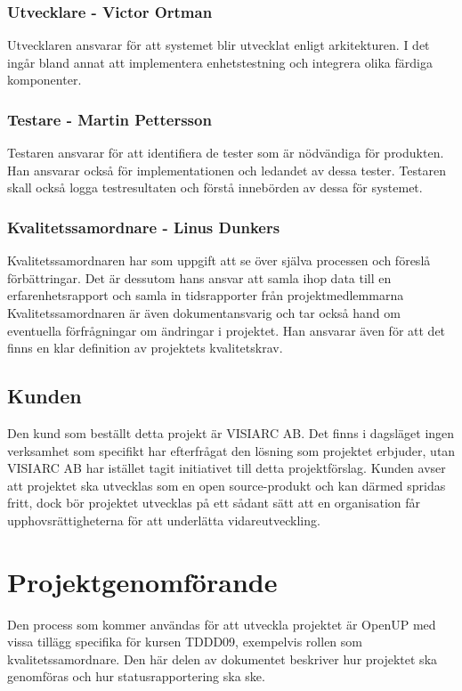 \subsubsection*{Utvecklare - Victor Ortman}
Utvecklaren ansvarar för att systemet blir utvecklat enligt arkitekturen. I det ingår bland annat att implementera enhetstestning och integrera olika färdiga komponenter.

\subsubsection*{Testare - Martin Pettersson}
Testaren ansvarar för att identifiera de tester som är nödvändiga för produkten. Han ansvarar också för implementationen och ledandet av dessa tester. Testaren skall också logga testresultaten och förstå innebörden av dessa för systemet.

\subsubsection*{Kvalitetssamordnare - Linus Dunkers}
Kvalitetssamordnaren har som uppgift att se över själva processen och föreslå förbättringar. Det är dessutom hans ansvar att samla ihop data till en erfarenhetsrapport och samla in tidsrapporter från projektmedlemmarna Kvalitetssamordnaren är även dokumentansvarig och tar också hand om eventuella förfrågningar om ändringar i projektet. Han ansvarar även för att det finns en klar definition av projektets kvalitetskrav.

\subsection{Kunden}
Den kund som beställt detta projekt är VISIARC AB. Det finns i dagsläget ingen verksamhet som specifikt har efterfrågat den lösning som projektet erbjuder, utan VISIARC AB har istället tagit initiativet till detta projektförslag. Kunden avser att projektet ska utvecklas som en open source-produkt och kan därmed spridas fritt, dock bör projektet utvecklas på ett sådant sätt att en organisation får upphovsrättigheterna för att underlätta vidareutveckling.

\section{Projektgenomförande}
Den process som kommer användas för att utveckla projektet är OpenUP\cite{openup} med vissa tillägg specifika för kursen TDDD09, exempelvis rollen som kvalitetssamordnare\cite{sandahl}. Den här delen av dokumentet beskriver hur projektet ska genomföras och hur statusrapportering ska ske.

